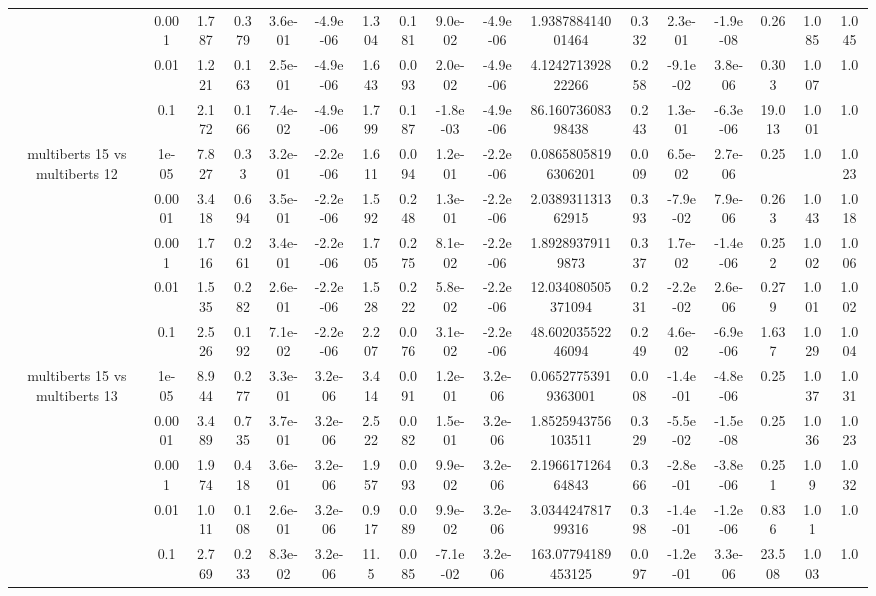 \begin{tabular}{|c|c|c|c|c|c|c|c|c|c|c|c|c|c|c|c|c|}
 & 0.001 & 1.787 & 0.379 & 3.6e-01 & -4.9e-06 & 1.304 & 0.181 & 9.0e-02 & -4.9e-06 & 1.938788414001464 & 0.332 & 2.3e-01 & -1.9e-08 & 0.26 & 1.085 & 1.045 \\
 & 0.01 & 1.221 & 0.163 & 2.5e-01 & -4.9e-06 & 1.643 & 0.093 & 2.0e-02 & -4.9e-06 & 4.124271392822266 & 0.258 & -9.1e-02 & 3.8e-06 & 0.303 & 1.007 & 1.0 \\
 & 0.1 & 2.172 & 0.166 & 7.4e-02 & -4.9e-06 & 1.799 & 0.187 & -1.8e-03 & -4.9e-06 & 86.16073608398438 & 0.243 & 1.3e-01 & -6.3e-06 & 19.013 & 1.001 & 1.0 \\
\hline
\multirow{5}{*}{multiberts 15 vs multiberts 12} & 1e-05 & 7.827 & 0.33 & 3.2e-01 & -2.2e-06 & 1.611 & 0.094 & 1.2e-01 & -2.2e-06 & 0.08658058196306201 & 0.009 & 6.5e-02 & 2.7e-06 & 0.25 & 1.0 & 1.023 \\
 & 0.0001 & 3.418 & 0.694 & 3.5e-01 & -2.2e-06 & 1.592 & 0.248 & 1.3e-01 & -2.2e-06 & 2.038931131362915 & 0.393 & -7.9e-02 & 7.9e-06 & 0.263 & 1.043 & 1.018 \\
 & 0.001 & 1.716 & 0.261 & 3.4e-01 & -2.2e-06 & 1.705 & 0.275 & 8.1e-02 & -2.2e-06 & 1.89289379119873 & 0.337 & 1.7e-02 & -1.4e-06 & 0.252 & 1.002 & 1.006 \\
 & 0.01 & 1.535 & 0.282 & 2.6e-01 & -2.2e-06 & 1.528 & 0.222 & 5.8e-02 & -2.2e-06 & 12.034080505371094 & 0.231 & -2.2e-02 & 2.6e-06 & 0.279 & 1.001 & 1.002 \\
 & 0.1 & 2.526 & 0.192 & 7.1e-02 & -2.2e-06 & 2.207 & 0.076 & 3.1e-02 & -2.2e-06 & 48.60203552246094 & 0.249 & 4.6e-02 & -6.9e-06 & 1.637 & 1.029 & 1.004 \\
\hline
\multirow{5}{*}{multiberts 15 vs multiberts 13} & 1e-05 & 8.944 & 0.277 & 3.3e-01 & 3.2e-06 & 3.414 & 0.091 & 1.2e-01 & 3.2e-06 & 0.06527753919363001 & 0.008 & -1.4e-01 & -4.8e-06 & 0.25 & 1.037 & 1.031 \\
 & 0.0001 & 3.489 & 0.735 & 3.7e-01 & 3.2e-06 & 2.522 & 0.082 & 1.5e-01 & 3.2e-06 & 1.8525943756103511 & 0.329 & -5.5e-02 & -1.5e-08 & 0.25 & 1.036 & 1.023 \\
 & 0.001 & 1.974 & 0.418 & 3.6e-01 & 3.2e-06 & 1.957 & 0.093 & 9.9e-02 & 3.2e-06 & 2.196617126464843 & 0.366 & -2.8e-01 & -3.8e-06 & 0.251 & 1.09 & 1.032 \\
 & 0.01 & 1.011 & 0.108 & 2.6e-01 & 3.2e-06 & 0.917 & 0.089 & 9.9e-02 & 3.2e-06 & 3.034424781799316 & 0.398 & -1.4e-01 & -1.2e-06 & 0.836 & 1.01 & 1.0 \\
 & 0.1 & 2.769 & 0.233 & 8.3e-02 & 3.2e-06 & 11.5 & 0.085 & -7.1e-02 & 3.2e-06 & 163.07794189453125 & 0.097 & -1.2e-01 & 3.3e-06 & 23.508 & 1.003 & 1.0 \\

\end{tabular}
